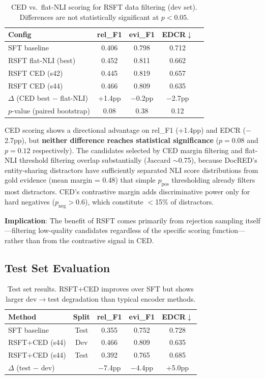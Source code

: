\documentclass[11pt,a4paper]{article}
\begin{document}
\begin{table}[t]
\centering
\caption{CED vs.\ flat-NLI scoring for RSFT data filtering (dev set). Differences are not statistically significant at $p < 0.05$.}
\label{tab:ced_vs_flatnli}
\small
\begin{tabular}{lcccc}
\toprule
\textbf{Config} & \textbf{rel\_F1} & \textbf{evi\_F1} & \textbf{EDCR}$\downarrow$ \\
\midrule
SFT baseline           & 0.406 & 0.798 & 0.712 \\
RSFT flat-NLI (best)   & 0.452 & 0.811 & 0.662 \\
RSFT CED (s42)         & 0.445 & 0.819 & 0.657 \\
RSFT CED (s44)         & 0.466 & 0.809 & 0.635 \\
\midrule
$\Delta$ (CED best $-$ flat-NLI) & +1.4pp & $-$0.2pp & $-$2.7pp \\
$p$-value (paired bootstrap) & 0.08 & 0.38 & 0.12 \\
\bottomrule
\end{tabular}
\end{table}

CED scoring shows a directional advantage on rel\_F1 (+1.4pp) and EDCR ($-$2.7pp), but \textbf{neither difference reaches statistical significance} ($p = 0.08$ and $p = 0.12$ respectively).
The candidates selected by CED margin filtering and flat-NLI threshold filtering overlap substantially (Jaccard $\sim$0.75), because DocRED's entity-sharing distractors have sufficiently separated NLI score distributions from gold evidence (mean margin = 0.48) that simple $p_{\text{pos}}$ thresholding already filters most distractors.
CED's contrastive margin adds discriminative power only for hard negatives ($p_{\text{neg}} > 0.6$), which constitute $<$15\% of distractors.

\textbf{Implication}: The benefit of RSFT comes primarily from rejection sampling itself---filtering low-quality candidates regardless of the specific scoring function---rather than from the contrastive signal in CED.

\subsection{Test Set Evaluation}
\label{sec:test}

\begin{table}[t]
\centering
\caption{Test set results. RSFT+CED improves over SFT but shows larger dev$\to$test degradation than typical encoder methods.}
\label{tab:test}
\small
\begin{tabular}{lcccc}
\toprule
\textbf{Method} & \textbf{Split} & \textbf{rel\_F1} & \textbf{evi\_F1} & \textbf{EDCR}$\downarrow$ \\
\midrule
SFT baseline    & Test & 0.355 & 0.752 & 0.728 \\
RSFT+CED (s44)  & Dev  & 0.466 & 0.809 & 0.635 \\
RSFT+CED (s44)  & Test & 0.392 & 0.765 & 0.685 \\
$\Delta$ (test $-$ dev) & & $-$7.4pp & $-$4.4pp & +5.0pp \\
\bottomrule
\end{tabular}
\end{table}
\end{document}
